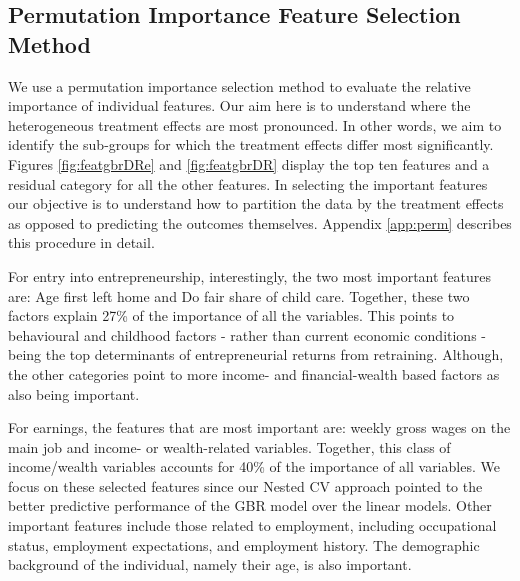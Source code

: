 \documentclass[12pt, a4paper]{article}
\begin{document}

\subsection{Permutation Importance Feature Selection Method}

We use a permutation importance selection method \citep{breiman2001,molnar2020}
to evaluate the relative importance of individual features. Our aim here is to
understand where the heterogeneous treatment effects are most pronounced. In
other words, we aim to identify the sub-groups for which the treatment effects
differ most significantly. Figures \ref{fig:featgbrDRe} and \ref{fig:featgbrDR} display the top ten features and a residual category for all the other features. In selecting the important features our objective is to understand how to partition the data by the treatment effects as opposed to predicting the outcomes themselves. Appendix \ref{app:perm} describes this procedure in detail.

For entry into entrepreneurship, interestingly, the two most important features are: Age first left home and Do fair share of child care. Together, these two factors explain 27\% of the importance of all the variables. This points to behavioural and childhood factors - rather than current economic conditions - being the top determinants of entrepreneurial returns from retraining. Although, the other categories point to more income- and financial-wealth based factors as also being important. 

For earnings, the features that are most important are: weekly gross
wages on the main job and income- or wealth-related variables. Together, this
class of income/wealth variables accounts for 40\% of the importance of all
variables. We focus on these selected features since our Nested CV approach
pointed to the better predictive performance of the GBR model over the linear
models. Other important features include those related to employment, including
occupational status, employment expectations, and employment history. The
demographic background of the individual, namely their age, is also important. 

\end{document}
